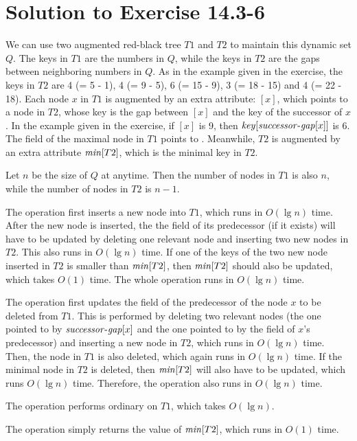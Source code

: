 \documentclass[a4paper, fleqn]{article}
\begin{document}
\section*{Solution to Exercise 14.3-6}

We can use two augmented red-black tree $T1$ and $T2$ to maintain this
dynamic set $Q$. The keys in $T1$ are the numbers in $Q$, while the
keys in $T2$ are the gaps between neighboring numbers in $Q$. As in
the example given in the exercise, the keys in $T2$ are 4 (= 5 - 1), 4
(= 9 - 5), 6 (= 15 - 9), 3 (= 18 - 15) and 4 (= 22 - 18). Each node
$x$ in $T1$ is augmented by an extra attribute:
$[x]$, which points to a node in $T2$, whose key is
the gap between $[x]$ and the key of the successor of $x$.  In
the example given in the exercise, if $[x]$ is 9, then
$\id{key}[\id{successor-gap}[x]]$ is 6. The  field
of the maximal node in $T1$ points to . Meanwhile, $T2$ is
augmented by an extra attribute $\id{min}[T2]$, which is the minimal
key in $T2$.

Let $n$ be the size of $Q$ at anytime. Then the number of nodes in
$T1$ is also $n$, while the number of nodes in $T2$ is $n-1$.

The  operation first inserts a new node into $T1$, which
runs in $O(\lg n)$ time. After the new node is inserted, the the
 field of its predecessor (if it exists) will have
to be updated by deleting one relevant node and inserting two new
nodes in $T2$.  This also runs in $O(\lg n)$ time. If one of the keys
of the two new node inserted in $T2$ is smaller than $\id{min}[T2]$,
then $\id{min}[T2]$ should also be updated, which takes $O(1)$ time.
The whole  operation runs in $O(\lg n)$ time.

The  operation first updates the  field
of the predecessor of the node $x$ to be deleted from $T1$. This is
performed by deleting two relevant nodes (the one pointed to by
$\id{successor-gap}[x]$ and the one pointed to by the
 field of $x$'s predecessor) and inserting a new node
in $T2$, which runs in $O(\lg n)$ time. Then, the node in $T1$ is also
deleted, which again runs in $O(\lg n)$ time. If the minimal node in
$T2$ is deleted, then $\id{min}[T2]$ will also have to be updated,
which runs $O(\lg n)$ time. Therefore, the  operation
also runs in $O(\lg n)$ time.

The  operation performs ordinary  on
$T1$, which takes $O(\lg n)$.

The  operation simply returns the value of
$\id{min}[T2]$, which runs in $O(1)$ time.
\end{document}
